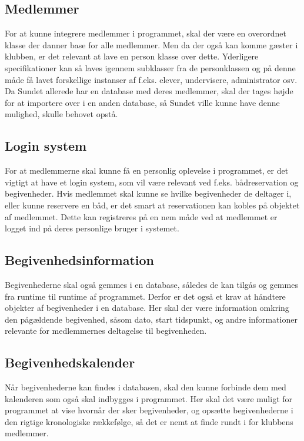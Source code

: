 \subsection{Medlemmer}

For at kunne integrere medlemmer i programmet, skal der være en overordnet klasse der danner base for alle
medlemmer. Men da der også kan komme gæster i klubben, er det relevant at lave en person klasse over dette.
Yderligere specifikationer kan så laves igennem subklasser fra de personklassen og på denne måde få lavet forskellige
instanser af f.eks. elever, undervisere, administrator osv. Da Sundet allerede har en database med deres medlemmer, skal
der tages højde for at importere over i en anden database, så Sundet ville kunne have denne mulighed, skulle behovet
opstå.

\subsection{Login system}

For at medlemmerne skal kunne få en personlig oplevelse i programmet, er det vigtigt at have et login system, som vil
være relevant ved f.eks. bådreservation og begivenheder. Hvis medlemmet skal kunne se hvilke begivenheder de deltager i,
eller kunne reservere en båd, er det smart at reservationen kan kobles på objektet af medlemmet. Dette kan
registreres på en nem måde ved at medlemmet er logget ind på deres personlige bruger i systemet.


\subsection{Begivenhedsinformation}

Begivenhederne skal også gemmes i en database, således de kan tilgås og gemmes fra runtime til runtime af programmet. 
Derfor er det også et krav at håndtere objekter af begivenheder i en database. Her skal der være information omkring den
pågældende begivenhed, såsom dato, start tidspunkt, og andre informationer relevante for medlemmernes deltagelse til
begivenheden.

\subsection{Begivenhedskalender}

Når begivenhederne kan findes i databasen, skal den kunne forbinde dem med kalenderen som også skal indbygges i
programmet. Her skal det være muligt for programmet at vise hvornår der sker begivenheder, og opsætte begivenhederne i
den rigtige kronologiske rækkefølge, så det er nemt at finde rundt i for klubbens medlemmer.


